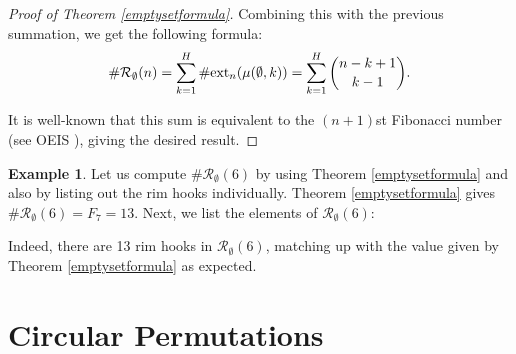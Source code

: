\documentclass[11pt, a4paper, reqno]{article}
\numberwithin{equation}{section}
\newcommand{\ds}{\displaystyle}
\newcommand{\ext}{\text{ext}}
\theoremstyle{definition}
\newtheorem{example}[theorem]{Example}
\begin{document}
\begin{proof}[Proof of Theorem \ref{emptysetformula}]
    Combining this with the previous summation, we get the following formula: $$\#\mathcal{R}_\emptyset(n) = \ds \sum_{k = 1}^H\#\ext_n(\mu(\emptyset,k)) = \sum_{k=1}^H\dbinom{n - k + 1}{k - 1}.$$
    
    It is well-known that this sum is equivalent to the $(n+1)$st Fibonacci number (see OEIS \cite{fibNum}), giving the desired result.
    \end{proof}
    
    \begin{example}
    Let us compute $\#\mathcal{R}_\emptyset(6)$ by using Theorem \ref{emptysetformula} and also by listing out the rim hooks individually. Theorem \ref{emptysetformula} gives $\#\mathcal{R}_\emptyset(6) = F_{7} = 13.$ Next, we list the elements of $\mathcal{R}_\emptyset(6)$:
    
    \vspace{0.3cm}
	\begin{center}
	\end{center}
	\vspace{0.3cm}
	\begin{center}
	\end{center}
	\vspace{0.3cm}
    Indeed, there are 13 rim hooks in $\mathcal{R}_\emptyset(6)$, matching up with the value given by Theorem \ref{emptysetformula} as expected.
    \end{example}
	
	\section{Circular Permutations}\label{other}
	
\end{document}
